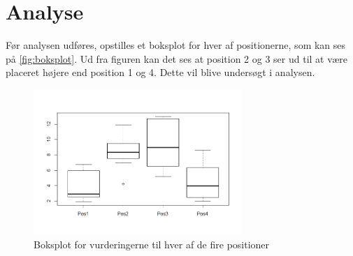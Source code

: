 \section*{Analyse}
\label{analysis}
Før analysen udføres, opstilles et boksplot for hver af positionerne, som kan ses på \autoref{fig:boksplot}. Ud fra figuren kan det ses at position 2 og 3 ser ud til at være placeret højere end position 1 og 4. Dette vil blive undersøgt i analysen.

\begin{figure}[H]
\centering
\includegraphics[width = 0.7\textwidth]{Figure/Rplot.png} 
\caption{Boksplot for vurderingerne til hver af de fire positioner}
\label{fig:boksplot}
\end{figure}

